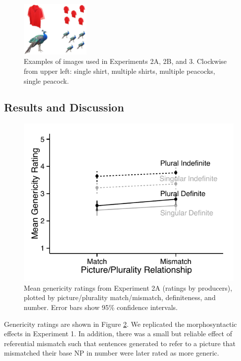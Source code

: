 \documentclass[10pt,letterpaper]{article}
\begin{document}
\begin{figure}[t]
\begin{center}
\includegraphics[width=0.3\textwidth]{figures/stimuli.jpg}
\end{center}
\caption{Examples of images used in Experiments 2A, 2B, and 3. Clockwise from upper left: single shirt, multiple shirts, multiple peacocks, single peacock.} 
\label{fig:stim}
\end{figure}

\subsection{Results and Discussion}

\begin{figure}[t]
\centering
\includegraphics[width=.9\linewidth]{figures/e2a_mod.pdf}
\caption{\label{fig:e2a} Mean genericity ratings from Experiment 2A (ratings by producers), plotted by picture/plurality match/mismatch, definiteness, and number. Error bars show 95\% confidence intervals.} 
\end{figure}

Genericity ratings are shown in Figure \ref{fig:e2a}. We replicated the morphosyntactic effects in Experiment 1. In addition, there was a small but reliable effect of referential mismatch such that sentences generated to refer to a picture that mismatched their base NP in number were later rated as more generic. 
\end{document}
